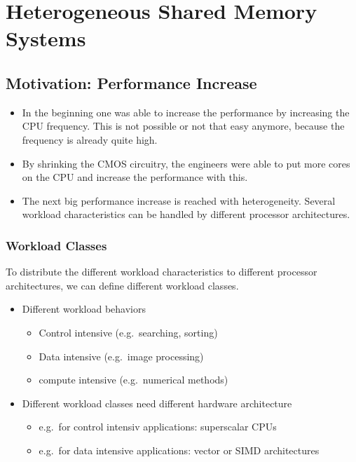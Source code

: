 \hypertarget{heterogeneous-shared-memory-systems}{%
\section{Heterogeneous Shared Memory
Systems}\label{heterogeneous-shared-memory-systems}}

\hypertarget{motivation-performance-increase}{%
\subsection{Motivation: Performance
Increase}\label{motivation-performance-increase}}

\begin{itemize}
\tightlist
\item
  In the beginning one was able to increase the performance by
  increasing the CPU frequency. This is not possible or not that easy
  anymore, because the frequency is already quite high.
\item
  By shrinking the CMOS circuitry, the engineers were able to put more
  cores on the CPU and increase the performance with this.
\item
  The next big performance increase is reached with heterogeneity.
  Several workload characteristics can be handled by different processor
  architectures.
\end{itemize}

\hypertarget{workload-classes}{%
\subsubsection{Workload Classes}\label{workload-classes}}

To distribute the different workload characteristics to different
processor architectures, we can define different workload classes.

\begin{itemize}
\tightlist
\item
  Different workload behaviors

  \begin{itemize}
  \tightlist
  \item
    Control intensive (e.g.~searching, sorting)
  \item
    Data intensive (e.g.~image processing)
  \item
    compute intensive (e.g.~numerical methods)
  \end{itemize}
\item
  Different workload classes need different hardware architecture

  \begin{itemize}
  \tightlist
  \item
    e.g.~for control intensiv applications: superscalar CPUs
  \item
    e.g.~for data intensive applications: vector or SIMD architectures
  \end{itemize}
\end{itemize}

